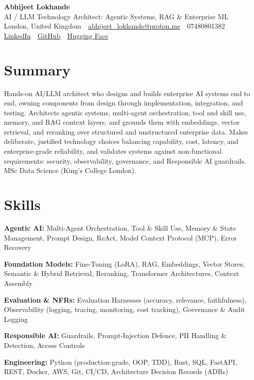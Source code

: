 \documentclass[10pt,a4paper]{article}
\newcommand{\sep}{\,\textcolor{accent!60}{\textbar}\,}
\begin{document}
\begin{center}
  {\fontsize{24}{26}\selectfont\bfseries Abhijeet Lokhande}\\[3pt]
  {\color{accent}\large AI / LLM Technology Architect: Agentic Systems, RAG \& Enterprise ML}\\[5pt]
  {\small
    London, United Kingdom \sep
    \href{mailto:abhijeet_lokhande@proton.me}{abhijeet\_lokhande@proton.me} \sep
    07480801382 \\[2pt]
    \href{https://www.linkedin.com/in/ablds/}{LinkedIn} \sep
    \href{https://github.com/abhijeetscode}{GitHub} \sep
    \href{https://huggingface.co/ab-ai}{Hugging Face}
  }
\end{center}
\vspace{2pt}

\section{Summary}
Hands-on AI/LLM architect who designs and builds enterprise AI systems end to end, owning components from design through implementation, integration, and testing. Architects agentic systems, multi-agent orchestration, tool and skill use, memory, and RAG context layers, and grounds them with embeddings, vector retrieval, and reranking over structured and unstructured enterprise data. Makes deliberate, justified technology choices balancing capability, cost, latency, and enterprise-grade reliability, and validates systems against non-functional requirements: security, observability, governance, and Responsible AI guardrails. MSc Data Science (King's College London).

\section{Skills}
\begin{tight}
  \item[\textcolor{accent}{\small$\bullet$}] \textbf{Agentic AI:} Multi-Agent Orchestration, Tool \& Skill Use, Memory \& State Management, Prompt Design, ReAct, Model Context Protocol (MCP), Error Recovery
  \item[\textcolor{accent}{\small$\bullet$}] \textbf{Foundation Models:} Fine-Tuning (LoRA), RAG, Embeddings, Vector Stores, Semantic \& Hybrid Retrieval, Reranking, Transformer Architectures, Context Assembly
  \item[\textcolor{accent}{\small$\bullet$}] \textbf{Evaluation \& NFRs:} Evaluation Harnesses (accuracy, relevance, faithfulness), Observability (logging, tracing, monitoring, cost tracking), Governance \& Audit Logging
  \item[\textcolor{accent}{\small$\bullet$}] \textbf{Responsible AI:} Guardrails, Prompt-Injection Defence, PII Handling \& Detection, Access Controls
  \item[\textcolor{accent}{\small$\bullet$}] \textbf{Engineering:} Python (production-grade, OOP, TDD), Rust, SQL, FastAPI, REST, Docker, AWS, Git, CI/CD, Architecture Decision Records (ADRs)
\end{tight}
\end{document}
